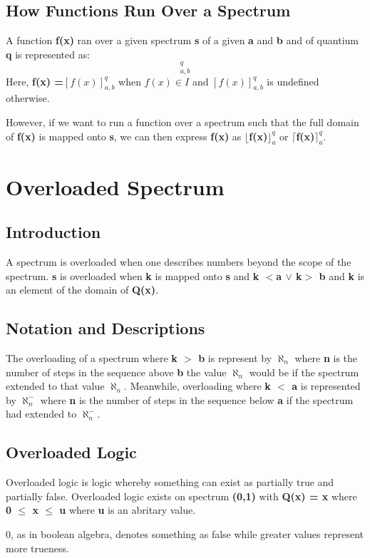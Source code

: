 \documentclass[12pt]{scrreprt}
\begin{document}
\section{How Functions Run Over a Spectrum}
A function \textbf{f(x)} ran over a given spectrum \textbf{s} of a given \textbf{a} and \textbf{b} and of quantium \textbf{q} is represented as:
\begin{equation}[f(x)]_{a,b}^q
\end{equation}
Here, \textbf{f(x) =$ [f(x)]_{a,b}^q$} when \textbf{$f(x) \in I$} and \textbf{$[f(x)]_{a,b}^q$} is undefined otherwise.
\par However, if we want to run a function over a spectrum such that the full domain of \textbf{f(x)} is mapped onto \textbf{s}, we can then express \textbf{f(x)} as  \textbf{$\lfloor$f(x)$\rfloor_a^q $} or \textbf{$\lceil$f(x)$\rceil_a^q $}.
\chapter{Overloaded Spectrum}
\section{Introduction}
A spectrum is overloaded when one describes numbers beyond the scope of the spectrum. \textbf{s} is overloaded when \textbf{k} is mapped onto \textbf{s} and \textbf{k $<$a $\vee $ k$>$ b } and \textbf{k} is an element of the domain of \textbf{Q(x)}. 
\section{Notation and Descriptions}
The overloading of a spectrum where \textbf{k $>$ b}  is represent by $\aleph_n$ where \textbf{n} is the number of steps in the sequence above \textbf{b} the value  $\aleph_n$ would be if the spectrum extended to that value  $\aleph_n$. Meanwhile, overloading where  \textbf{k $<$ a} is represented by  $\aleph_n^-$ where \textbf{n} is the number of steps in the sequence below \textbf{a} if the spectrum had extended to $\aleph_n^-$.
\section{Overloaded Logic}
Overloaded logic is logic whereby something can exist as partially true and partially false. Overloaded logic exists on spectrum \textbf{(0,1)} with \textbf{Q(x) = x} where \textbf{0 $\leq$ x $\leq$ u} where \textbf{u} is an abritary value.
 \par0, as in boolean algebra, denotes something as false while greater values represent more trueness. 
\end{document}
